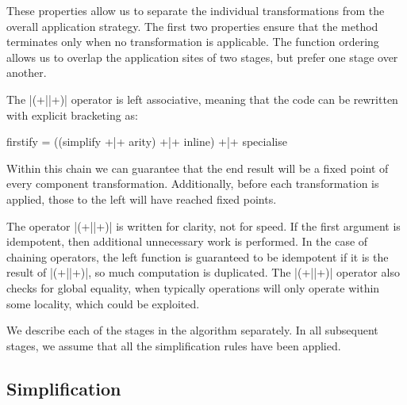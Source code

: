 \documentclass[preprint]{sigplanconf}
\begin{document}
These properties allow us to separate the individual transformations from the overall application strategy. The first two properties ensure that the method terminates only when no transformation is applicable. The function ordering allows us to overlap the application sites of two stages, but prefer one stage over another.

The |(+||+)| operator is left associative, meaning that the code can be rewritten with explicit bracketing as:

\begin{code}
firstify = ((simplify +|+ arity) +|+ inline) +|+ specialise
\end{code}

Within this chain we can guarantee that the end result will be a fixed point of every component transformation. Additionally, before each transformation is applied, those to the left will have reached fixed points.

The operator |(+||+)| is written for clarity, not for speed. If the first argument is idempotent, then additional unnecessary work is performed. In the case of chaining operators, the left function is guaranteed to be idempotent if it is the result of |(+||+)|, so much computation is duplicated. The |(+||+)| operator also checks for global equality, when typically operations will only operate within some locality, which could be exploited.

We describe each of the stages in the algorithm separately. In all subsequent stages, we assume that all the simplification rules have been applied.


\subsection{Simplification}
\end{document}

